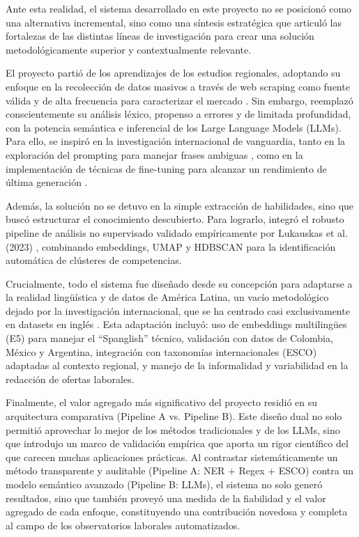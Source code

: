 Ante esta realidad, el sistema desarrollado en este proyecto no se posicionó como una alternativa incremental, sino como una síntesis estratégica que articuló las fortalezas de las distintas líneas de investigación para crear una solución metodológicamente superior y contextualmente relevante.

El proyecto partió de los aprendizajes de los estudios regionales, adoptando su enfoque en la recolección de datos masivos a través de web scraping como fuente válida y de alta frecuencia para caracterizar el mercado \cite{aguilera2018, martinez2024, rubio2025}. Sin embargo, reemplazó conscientemente su análisis léxico, propenso a errores y de limitada profundidad, con la potencia semántica e inferencial de los Large Language Models (LLMs). Para ello, se inspiró en la investigación internacional de vanguardia, tanto en la exploración del prompting para manejar frases ambiguas \cite{nguyen2024}, como en la implementación de técnicas de fine-tuning para alcanzar un rendimiento de última generación \cite{herandi2024}.

Además, la solución no se detuvo en la simple extracción de habilidades, sino que buscó estructurar el conocimiento descubierto. Para lograrlo, integró el robusto pipeline de análisis no supervisado validado empíricamente por Lukauskas et al. (2023) \cite{lukauskas2023}, combinando embeddings, UMAP y HDBSCAN para la identificación automática de clústeres de competencias.

Crucialmente, todo el sistema fue diseñado desde su concepción para adaptarse a la realidad lingüística y de datos de América Latina, un vacío metodológico dejado por la investigación internacional, que se ha centrado casi exclusivamente en datasets en inglés \cite{herandi2024}. Esta adaptación incluyó: uso de embeddings multilingües (E5) para manejar el ``Spanglish'' técnico, validación con datos de Colombia, México y Argentina, integración con taxonomías internacionales (ESCO) adaptadas al contexto regional, y manejo de la informalidad y variabilidad en la redacción de ofertas laborales.

Finalmente, el valor agregado más significativo del proyecto residió en su arquitectura comparativa (Pipeline A vs. Pipeline B). Este diseño dual no solo permitió aprovechar lo mejor de los métodos tradicionales y de los LLMs, sino que introdujo un marco de validación empírica que aporta un rigor científico del que carecen muchas aplicaciones prácticas. Al contrastar sistemáticamente un método transparente y auditable (Pipeline A: NER + Regex + ESCO) contra un modelo semántico avanzado (Pipeline B: LLMs), el sistema no solo generó resultados, sino que también proveyó una medida de la fiabilidad y el valor agregado de cada enfoque, constituyendo una contribución novedosa y completa al campo de los observatorios laborales automatizados.
